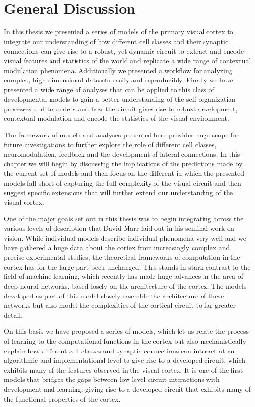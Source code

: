 \chapter{General Discussion}

In this thesis we presented a series of models of the primary visual
cortex to integrate our understanding of how different cell classes
and their synaptic connections can give rise to a robust, yet dynamic
circuit to extract and encode visual features and statistics of the
world and replicate a wide range of contextual modulation
phenomena. Additionally we presented a workflow for analyzing complex,
high-dimensional datasets easily and reproducibly. Finally we have
presented a wide range of analyses that can be applied to this class
of developmental models to gain a better understanding of the
self-organization processes and to understand how the circuit gives
rise to robust development, contextual modulation and encode the
statistics of the visual environment.

The framework of models and analyses presented here provides huge
scope for future investigations to further explore the role of
different cell classes, neuromodulation, feedback and the development
of lateral connections. In this chapter we will begin by discussing
the implications of the predictions made by the current set of models
and then focus on the different in which the presented models fall
short of capturing the full complexity of the visual circuit and then
suggest specific extensions that will further extend our understanding
of the visual cortex.

One of the major goals set out in this thesis was to begin integrating
across the various levels of description that David Marr laid out in
his seminal work on vision. While individual models describe
individual phenomena very well and we have gathered a huge data about
the cortex from increasingly complex and precise experimental studies,
the theoretical frameworks of computation in the cortex has for the
large part been unchanged. This stands in stark contrast to the field
of machine learning, which recently has made huge advances in the area
of deep neural networks, based losely on the architecture of the
cortex. The models developed as part of this model closely resemble
the architecture of these networks but also model the complexities of
the cortical circuit to far greater detail.

On this basis we have proposed a series of models, which let us relate
the process of learning to the computational functions in the cortex
but also mechanistically explain how different cell classes and
synaptic connections can interact at an algorithmic and
implementational level to give rise to a developed circuit, which
exhibits many of the features observed in the visual cortex. It is one
of the first models that bridges the gaps between low level circuit
interactions with development and learning, giving rise to a developed
circuit that exhibits many of the functional properties of the cortex.

